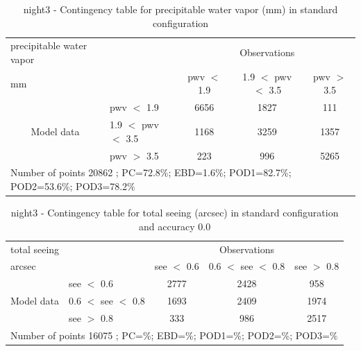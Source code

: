 \begin{table}[p!]
\begin{center}
\begin{tabular}{llccc}
\hline
{precipitable water vapor}                                       &                                                    & \multicolumn{3}{c}{Observations}                 \\
{mm}                                       &                             & pwv $<$ 1.9   & 1.9 $<$ pwv $<$ 3.5 & pwv $>$ 3.5 \\
\hline
\multicolumn{1}{c}{\multirow{3}{*}{Model data}}  & pwv $<$ 1.9             & 6656                & 1827                       & 111              \\
                                                 & 1.9  $<$ pwv $<$ 3.5 & 1168                & 3259                       & 1357              \\
                                                 & pwv $>$ 3.5             & 223                & 996                       & 5265              \\
\hline
\multicolumn{5}{l}{ Number of points        20862 ; PC=72.8\%; EBD=1.6\%; POD1=82.7\%; POD2=53.6\%; POD3=78.2\%}                 \\
\end{tabular}
\end{center}
\caption{night3 - Contingency table for  precipitable water vapor (mm) in standard configuration  }
\label{tab:contingencypwvBEF:night3}
\end{table}
\clearpage
\begin{table}[p!]
\begin{center}
\begin{tabular}{llccc}
\hline
{total seeing}                                       &                                                    & \multicolumn{3}{c}{Observations}                 \\
{arcsec}                                       &                             & see $<$ 0.6   & 0.6 $<$ see $<$ 0.8 & see $>$ 0.8 \\
\hline
\multicolumn{1}{c}{\multirow{3}{*}{Model data}}  & see $<$ 0.6             & 2777                & 2428                       & 958              \\
                                                 & 0.6  $<$ see $<$ 0.8 & 1693                & 2409                       & 1974              \\
                                                 & see $>$ 0.8             & 333                & 986                       & 2517              \\
\hline
\multicolumn{5}{l}{ Number of points        16075 ; PC=\%; EBD=\%; POD1=\%; POD2=\%; POD3=\%}
\end{tabular}
\end{center}
\caption{night3 - Contingency table for  total seeing (arcsec) in standard configuration and accuracy 0.0}
\label{tab:contingencyseeBEF:night3}
\end{table}
